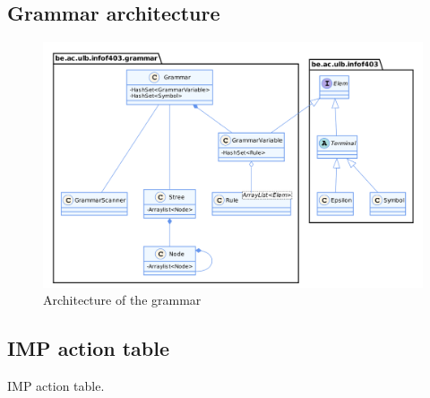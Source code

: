 \documentclass[a4paper,11pt]{article}
\begin{document}
  \subsection{Grammar architecture}
    \begin{figure}
      \centering
      \includegraphics[width=\textwidth]{./img/class_grammar.png}
      \caption{Architecture of the grammar}
      \label{fig:grammararchitecture}
    \end{figure}
    
  \subsection{IMP action table}
    \begin{table} %
      \centering
      
      \caption{IMP action table.}
      \label{impactiontable}
    \end{table}
    
\end{document}
